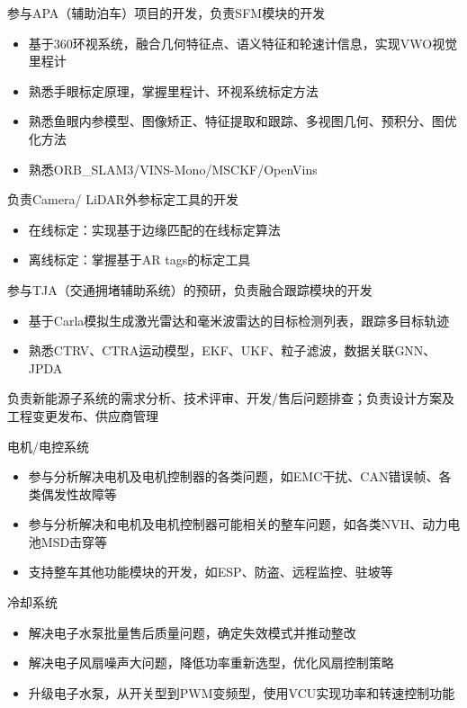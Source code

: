\documentclass{resume}
\begin{document}
\begin{onehalfspacing}
  参与APA（辅助泊车）项目的开发，负责SFM模块的开发
  \begin{itemize}
    \item 基于360环视系统，融合几何特征点、语义特征和轮速计信息，实现VWO视觉里程计
    \item 熟悉手眼标定原理，掌握里程计、环视系统标定方法
    \item 熟悉鱼眼内参模型、图像矫正、特征提取和跟踪、多视图几何、预积分、图优化方法
    \item 熟悉ORB\_SLAM3/VINS-Mono/MSCKF/OpenVins
  \end{itemize}

  负责Camera/ LiDAR外参标定工具的开发
  \begin{itemize}
    \item 在线标定：实现基于边缘匹配的在线标定算法
    \item 离线标定：掌握基于AR tags的标定工具
  \end{itemize}

  参与TJA（交通拥堵辅助系统）的预研，负责融合跟踪模块的开发
  \begin{itemize}
    \item 基于Carla模拟生成激光雷达和毫米波雷达的目标检测列表，跟踪多目标轨迹
    \item 熟悉CTRV、CTRA运动模型，EKF、UKF、粒子滤波，数据关联GNN、JPDA
  \end{itemize}
\end{onehalfspacing}

负责新能源子系统的需求分析、技术评审、开发/售后问题排查；负责设计方案及工程变更发布、供应商管理

\begin{onehalfspacing}
  电机/电控系统
  \begin{itemize}
    \item 参与分析解决电机及电机控制器的各类问题，如EMC干扰、CAN错误帧、各类偶发性故障等
    \item 参与分析解决和电机及电机控制器可能相关的整车问题，如各类NVH、动力电池MSD击穿等
    \item 支持整车其他功能模块的开发，如ESP、防盗、远程监控、驻坡等
  \end{itemize}

  冷却系统
  \begin{itemize}
    \item 解决电子水泵批量售后质量问题，确定失效模式并推动整改
    \item 解决电子风扇噪声大问题，降低功率重新选型，优化风扇控制策略
    \item 升级电子水泵，从开关型到PWM变频型，使用VCU实现功率和转速控制功能
  \end{itemize}
\end{onehalfspacing}
\end{document}
